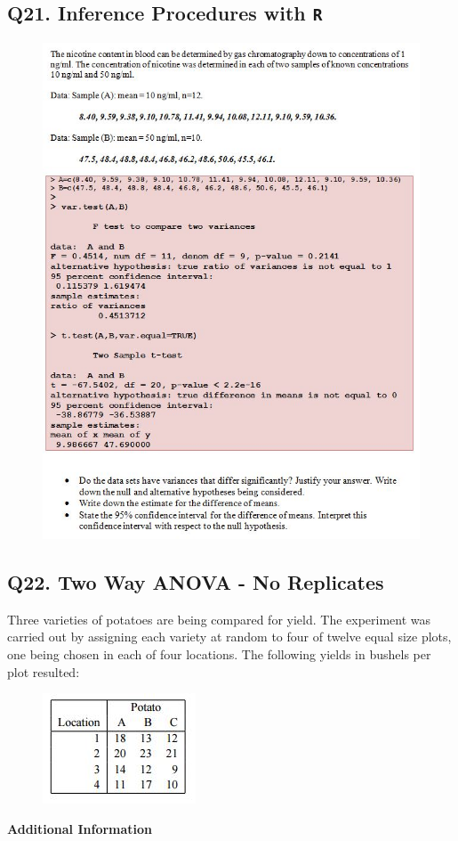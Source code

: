 \documentclass[a4paper,12pt]{article}
\begin{document}
\subsection*{Q21. Inference Procedures with \texttt{R}} %
\begin{figure}[h!]
\centering
\includegraphics[width=0.95\linewidth]{images/Q21review}

\end{figure}
\newpage
\subsection*{Q22. Two Way ANOVA - No Replicates} %

Three varieties of potatoes are being compared for yield. The experiment
was carried out by assigning each variety at random to four of twelve equal size
plots, one being chosen in each of four locations. The following yields in bushels per 
plot resulted:

\begin{figure}[h!]
	\centering
	\includegraphics[width=0.4\linewidth]{images/twowayanova-potato}
\end{figure}
\noindent \textbf{Additional Information} 
\end{document}
